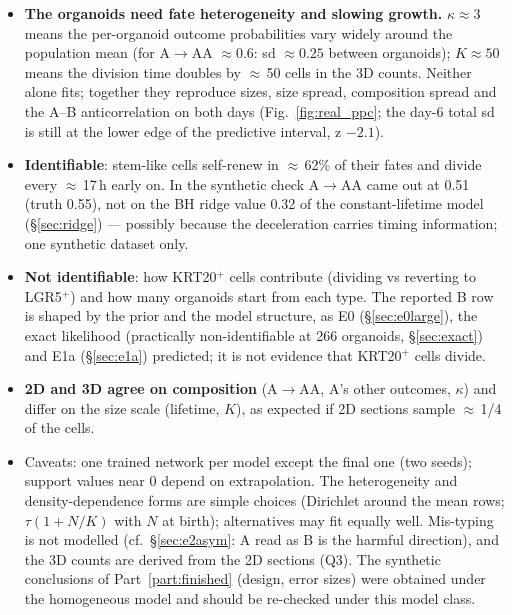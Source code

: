 \documentclass[10pt,a4paper]{article}
\begin{document}
\begin{itemize}
\item \textbf{The organoids need fate heterogeneity and slowing growth.} $\kappa \approx 3$ means the per-organoid outcome probabilities vary widely around the population mean (for A$\to$AA $\approx 0.6$: sd $\approx 0.25$ between organoids); $K \approx 50$ means the division time doubles by $\approx$\,50 cells in the 3D counts. Neither alone fits; together they reproduce sizes, size spread, composition spread and the A--B anticorrelation on both days (Fig.~\ref{fig:real_ppc}; the day-6 total sd is still at the lower edge of the predictive interval, z $-2.1$).
\item \textbf{Identifiable}: stem-like cells self-renew in $\approx$\,62\% of their fates and divide every $\approx$\,17\,h early on. In the synthetic check A$\to$AA came out at 0.51 (truth 0.55), not on the BH ridge value 0.32 of the constant-lifetime model (\S\ref{sec:ridge}) --- possibly because the deceleration carries timing information; one synthetic dataset only.
\item \textbf{Not identifiable}: how KRT20$^+$ cells contribute (dividing vs reverting to LGR5$^+$) and how many organoids start from each type. The reported B row is shaped by the prior and the model structure, as E0 (\S\ref{sec:e0large}), the exact likelihood (practically non-identifiable at 266 organoids, \S\ref{sec:exact}) and E1a (\S\ref{sec:e1a}) predicted; it is not evidence that KRT20$^+$ cells divide.
\item \textbf{2D and 3D agree on composition} (A$\to$AA, A's other outcomes, $\kappa$) and differ on the size scale (lifetime, $K$), as expected if 2D sections sample $\approx$\,1/4 of the cells.
\item Caveats: one trained network per model except the final one (two seeds); support values near 0 depend on extrapolation. The heterogeneity and density-dependence forms are simple choices (Dirichlet around the mean rows; $\tau(1+N/K)$ with $N$ at birth); alternatives may fit equally well. Mis-typing is not modelled (cf.\ \S\ref{sec:e2asym}: A read as B is the harmful direction), and the 3D counts are derived from the 2D sections (Q3). The synthetic conclusions of Part~\ref{part:finished} (design, error sizes) were obtained under the homogeneous model and should be re-checked under this model class.
\end{itemize}

\clearpage
\end{document}
